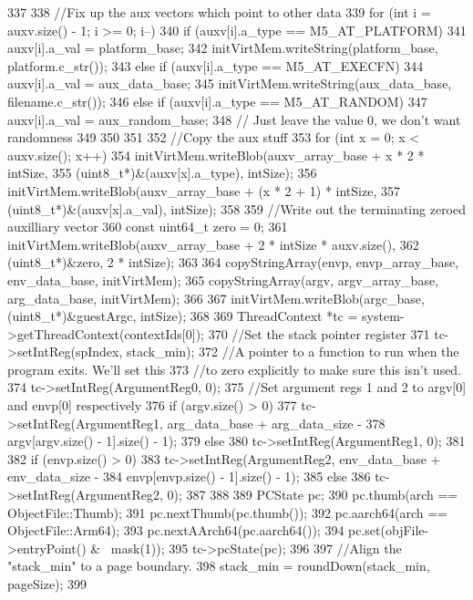 \begin{DoxyCode}
{337 
338     //Fix up the aux vectors which point to other data
339     for (int i = auxv.size() - 1; i >= 0; i--) {
340         if (auxv[i].a_type == M5_AT_PLATFORM) {
341             auxv[i].a_val = platform_base;
342             initVirtMem.writeString(platform_base, platform.c_str());
343         } else if (auxv[i].a_type == M5_AT_EXECFN) {
344             auxv[i].a_val = aux_data_base;
345             initVirtMem.writeString(aux_data_base, filename.c_str());
346         } else if (auxv[i].a_type == M5_AT_RANDOM) {
347             auxv[i].a_val = aux_random_base;
348             // Just leave the value 0, we don't want randomness
349         }
350     }
351 
352     //Copy the aux stuff
353     for (int x = 0; x < auxv.size(); x++) {
354         initVirtMem.writeBlob(auxv_array_base + x * 2 * intSize,
355                 (uint8_t*)&(auxv[x].a_type), intSize);
356         initVirtMem.writeBlob(auxv_array_base + (x * 2 + 1) * intSize,
357                 (uint8_t*)&(auxv[x].a_val), intSize);
358     }
359     //Write out the terminating zeroed auxilliary vector
360     const uint64_t zero = 0;
361     initVirtMem.writeBlob(auxv_array_base + 2 * intSize * auxv.size(),
362             (uint8_t*)&zero, 2 * intSize);
363 
364     copyStringArray(envp, envp_array_base, env_data_base, initVirtMem);
365     copyStringArray(argv, argv_array_base, arg_data_base, initVirtMem);
366 
367     initVirtMem.writeBlob(argc_base, (uint8_t*)&guestArgc, intSize);
368 
369     ThreadContext *tc = system->getThreadContext(contextIds[0]);
370     //Set the stack pointer register
371     tc->setIntReg(spIndex, stack_min);
372     //A pointer to a function to run when the program exits. We'll set this
373     //to zero explicitly to make sure this isn't used.
374     tc->setIntReg(ArgumentReg0, 0);
375     //Set argument regs 1 and 2 to argv[0] and envp[0] respectively
376     if (argv.size() > 0) {
377         tc->setIntReg(ArgumentReg1, arg_data_base + arg_data_size -
378                                     argv[argv.size() - 1].size() - 1);
379     } else {
380         tc->setIntReg(ArgumentReg1, 0);
381     }
382     if (envp.size() > 0) {
383         tc->setIntReg(ArgumentReg2, env_data_base + env_data_size -
384                                     envp[envp.size() - 1].size() - 1);
385     } else {
386         tc->setIntReg(ArgumentReg2, 0);
387     }
388 
389     PCState pc;
390     pc.thumb(arch == ObjectFile::Thumb);
391     pc.nextThumb(pc.thumb());
392     pc.aarch64(arch == ObjectFile::Arm64);
393     pc.nextAArch64(pc.aarch64());
394     pc.set(objFile->entryPoint() & ~mask(1));
395     tc->pcState(pc);
396 
397     //Align the "stack_min" to a page boundary.
398     stack_min = roundDown(stack_min, pageSize);
399 }
\end{DoxyCode}



